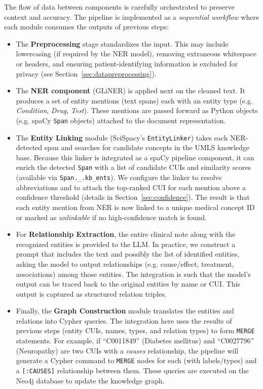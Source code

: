 The flow of data between components is carefully orchestrated to preserve context and accuracy. The pipeline is implemented as a \textit{sequential workflow} where each module consumes the outputs of previous steps:

\begin{itemize}
\item The \textbf{Preprocessing} stage standardizes the input. This may include lowercasing (if required by the NER model), removing extraneous whitespace or headers, and ensuring patient-identifying information is excluded for privacy (see Section~\ref{sec:datapreprocessing}).
\item The \textbf{NER component} (GLiNER) is applied next on the cleaned text. It produces a set of entity mentions (text spans) each with an entity type (e.g. \textit{Condition}, \textit{Drug}, \textit{Test}). These mentions are passed forward as Python objects (e.g. spaCy \texttt{Span} objects) attached to the document representation.
\item The \textbf{Entity Linking} module (SciSpacy's \texttt{EntityLinker}) takes each NER-detected span and searches for candidate concepts in the UMLS knowledge base. Because this linker is integrated as a spaCy pipeline component, it can enrich the detected \texttt{Span} with a list of candidate CUIs and similarity scores (available via \texttt{Span.\_.kb\_ents}). We configure the linker to resolve abbreviations and to attach the top-ranked CUI for each mention above a confidence threshold (details in Section~\ref{sec:confidence}). The result is that each entity mention from NER is now linked to a unique medical concept ID or marked as \textit{unlinkable} if no high-confidence match is found.
\item For \textbf{Relationship Extraction}, the entire clinical note along with the recognized entities is provided to the LLM. In practice, we construct a prompt that includes the text and possibly the list of identified entities, asking the model to output relationships (e.g. cause/effect, treatment, associations) among those entities. The integration is such that the model's output can be traced back to the original entities by name or CUI. This output is captured as structured relation triples.
\item Finally, the \textbf{Graph Construction} module translates the entities and relations into Cypher queries. The integration here uses the results of previous steps (entity CUIs, names, types, and relation types) to form \texttt{MERGE} statements. For example, if ``C0011849'' (Diabetes mellitus) and ``C0027796'' (Neuropathy) are two CUIs with a \textit{causes} relationship, the pipeline will generate a Cypher command to \texttt{MERGE} nodes for each (with labels/types) and a \texttt{[:CAUSES]} relationship between them. These queries are executed on the Neo4j database to update the knowledge graph.
\end{itemize}


